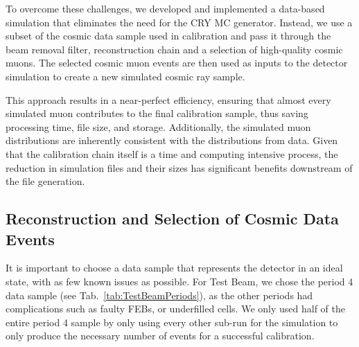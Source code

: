 To overcome these challenges, we developed and implemented a data-based simulation that eliminates the need for the \gls{CRY} \gls{MC} generator. Instead, we use a subset of the cosmic data sample used in calibration and pass it through the beam removal filter, reconstruction chain and a selection of high-quality cosmic muons. The selected cosmic muon events are then used as inputs to the detector simulation to create a new simulated cosmic ray sample.

This approach results in a near-perfect efficiency, ensuring that almost every simulated muon contributes to the final calibration sample, thus saving processing time, file size, and storage. Additionally, the simulated muon distributions are inherently consistent with the distributions from data. Given that the calibration chain itself is a time and computing intensive process, the reduction in simulation files and their sizes has significant benefits downstream of the file generation. 

\subsection{Reconstruction and Selection of Cosmic Data Events}\label{sec:CosmicGenAna}
It is important to choose a data sample that represents the detector in an ideal state, with as few known issues as possible. For Test Beam, we chose the period 4 data sample (see Tab.~\ref{tab:TestBeamPeriods}), as the other periods had complications such as faulty \gls{FEB}s, or underfilled cells. We only used half of the entire period 4 sample by only using every other sub-run for the simulation to only produce the necessary number of events for a successful calibration.


